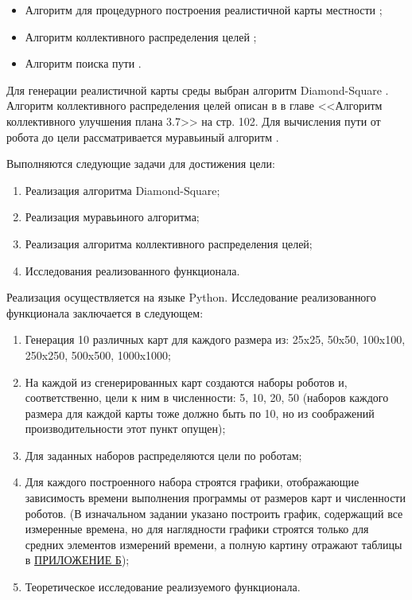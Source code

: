 \documentclass{article}
\numberwithin{equation}{section}
\begin{document}
    \begin{itemize}
        \item Алгоритм для процедурного построения реалистичной карты местности \cite{terrain};
        \item Алгоритм коллективного распределения целей \cite{plan};
        \item Алгоритм поиска пути \cite{path}.
	\end{itemize}

	Для генерации реалистичной карты среды выбран алгоритм Diamond-Square \cite{DS}. Алгоритм коллективного распределения целей описан в \cite{plan} в главе <<Алгоритм коллективного улучшения плана 3.7>> на стр. 102. Для вычисления пути от робота до цели рассматривается муравьиный алгоритм \cite{ant}.

	Выполняются следующие задачи для достижения цели:
	\begin{enumerate}
		\item Реализация алгоритма Diamond-Square;
		\item Реализация муравьиного алгоритма;
		\item Реализация алгоритма коллективного распределения целей;
		\item Исследования реализованного функционала.
	\end{enumerate}

	Реализация осуществляется на языке Python. Исследование реализованного функционала заключается в следующем:

	\begin{enumerate}
		\item Генерация 10 различных карт для каждого размера из: 25x25, 50x50, 100x100, 250x250, 500x500, 1000x1000;
		\item На каждой из сгенерированных карт создаются наборы роботов и, соответственно, цели к ним в численности: 5, 10, 20, 50 (наборов каждого размера для каждой карты тоже должно быть по 10, но из соображений производительности этот пункт опущен);
		\item Для заданных наборов распределяются цели по роботам;
		\item Для каждого построенного набора строятся графики, отображающие зависимость времени выполнения программы от размеров карт и численности роботов. (В изначальном задании указано построить график, содержащий все измеренные времена, но для наглядности графики строятся только для средних элементов измерений времени, а полную картину отражают таблицы в \hyperref[sec:time]{ПРИЛОЖЕНИЕ Б});
		\item Теоретическое исследование реализуемого функционала.
	\end{enumerate}
\end{document}
